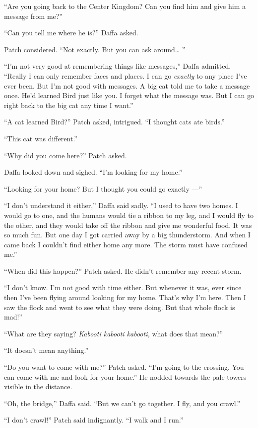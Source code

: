 \documentclass[ebook,oneside,openany,12pt]{memoir}
\begin{document}
“Are you going back to the Center Kingdom? Can you find him and give
him a message from me?”

“Can you tell me where he is?” Daffa asked.

Patch considered. “Not exactly. But you can ask around… ”

“I’m not very good at remembering things like messages,” Daffa
admitted. “Really I can only remember faces and places. I can go
\emph{exactly} to any place I’ve ever been. But I’m not good with
messages. A big cat told me to take a message once. He’d learned Bird
just like you. I forget what the message was. But I can go right back
to the big cat any time I want.”

“A cat learned Bird?” Patch asked, intrigued. “I thought cats ate
birds.”

“This cat was different.”

“Why did you come here?” Patch asked.

Daffa looked down and sighed. “I’m looking for my home.”

“Looking for your home? But I thought you could go exactly —”

“I don’t understand it either,” Daffa said sadly. “I used to have two
homes. I would go to one, and the humans would tie a ribbon to my leg,
and I would fly to the other, and they would take off the ribbon and
give me wonderful food. It was so much fun. But one day I got carried
away by a big thunderstorm. And when I came back I couldn’t find
either home any more. The storm must have confused me.”

“When did this happen?” Patch asked. He didn’t remember any recent
storm.

“I don’t know. I’m not good with time either. But whenever it was,
ever since then I’ve been flying around looking for my home. That’s
why I’m here. Then I saw the flock and went to see what they were
doing. But that whole flock is mad!”

“What are they saying? \emph{Kabooti kabooti kabooti,} what does
that mean?”

“It doesn’t mean anything.”

“Do you want to come with me?” Patch asked. “I’m going to the
crossing. You can come with me and look for your home.” He nodded
towards the pale towers visible in the distance.

“Oh, the bridge,” Daffa said. “But we can’t go together. I fly, and
you crawl.”

“I don’t crawl!” Patch said indignantly. “I walk and I run.”
\end{document}
